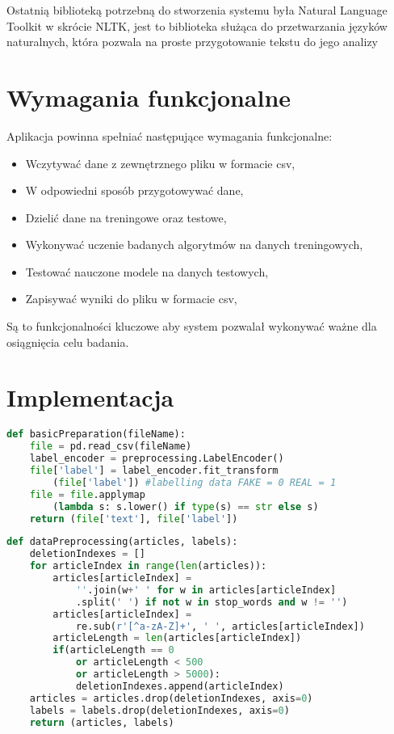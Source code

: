 Ostatnią biblioteką potrzebną do stworzenia systemu była Natural Language Toolkit w skrócie 
NLTK, jest to biblioteka służąca do przetwarzania języków naturalnych, która pozwala na proste przygotowanie tekstu do jego analizy
\section{Wymagania funkcjonalne}
Aplikacja powinna spełniać następujące wymagania funkcjonalne: 
\begin{itemize}
    \item Wczytywać dane z zewnętrznego pliku w formacie csv,
    \item W odpowiedni sposób przygotowywać dane,
    \item Dzielić dane na treningowe oraz testowe,
    \item Wykonywać uczenie badanych algorytmów na danych treningowych,
    \item Testować nauczone modele na danych testowych,
    \item Zapisywać wyniki do pliku w formacie csv,
\end{itemize}
Są to funkcjonalności kluczowe aby system pozwalał wykonywać ważne dla osiągnięcia celu
badania. 
\section{Implementacja}
\begin{lstlisting}[language=Python, caption={Funkcja przygotowywująca dane pobrane z pliku csv}, captionpos=b, frame=single]
def basicPreparation(fileName): 
    file = pd.read_csv(fileName)
    label_encoder = preprocessing.LabelEncoder()
    file['label'] = label_encoder.fit_transform
        (file['label']) #labelling data FAKE = 0 REAL = 1
    file = file.applymap
        (lambda s: s.lower() if type(s) == str else s) 
    return (file['text'], file['label'])

\end{lstlisting}

\begin{lstlisting}[language=Python, caption={Funkcja przygotowywująca dane tekstowe}, captionpos=b, frame=single]
def dataPreprocessing(articles, labels):
    deletionIndexes = []
    for articleIndex in range(len(articles)):
        articles[articleIndex] = 
            ''.join(w+' ' for w in articles[articleIndex]
            .split(' ') if not w in stop_words and w != '')  
        articles[articleIndex] = 
            re.sub(r'[^a-zA-Z]+', ' ', articles[articleIndex])
        articleLength = len(articles[articleIndex])
        if(articleLength == 0 
            or articleLength < 500 
            or articleLength > 5000):
            deletionIndexes.append(articleIndex) 
    articles = articles.drop(deletionIndexes, axis=0)
    labels = labels.drop(deletionIndexes, axis=0)
    return (articles, labels)

\end{lstlisting}

